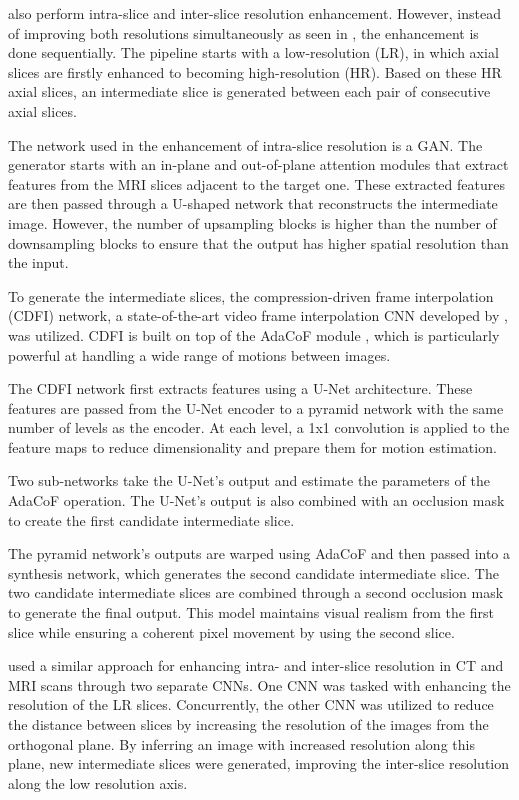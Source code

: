 \textcite{Nimitha2024} also perform intra-slice and inter-slice resolution enhancement. However, instead of improving both resolutions simultaneously as seen in \textcite{Zhang2024, Fang2022}, the enhancement is done sequentially. The pipeline starts with a low-resolution (LR), in which axial slices are firstly enhanced to becoming high-resolution (HR). Based on these HR axial slices, an intermediate slice is generated between each pair of consecutive axial slices.
\par
The network used in the enhancement of intra-slice resolution is a GAN. The generator starts with an in-plane and out-of-plane attention modules that extract features from the MRI slices adjacent to the target one. These extracted features are then passed through a U-shaped network that reconstructs the intermediate image. However, the number of upsampling blocks is higher than the number of downsampling blocks to ensure that the output has higher spatial resolution than the input.
\par
To generate the intermediate slices, the compression-driven frame interpolation (CDFI) network, a state-of-the-art video frame interpolation CNN developed by \textcite{Ding2021}, was utilized. CDFI is built on top of the AdaCoF module \parencite{Lee2020}, which is particularly powerful at handling a wide range of motions between images.
\par 
The CDFI network first extracts features using a U-Net architecture. These features are passed from the U-Net encoder to a pyramid network with the same number of levels as the encoder. At each level, a 1x1 convolution is applied to the feature maps to reduce dimensionality and prepare them for motion estimation.
\par
Two sub-networks take the U-Net's output and estimate the parameters of the AdaCoF operation. The U-Net's output is also combined with an occlusion mask to create the first candidate intermediate slice.
\par
The pyramid network's outputs are warped using AdaCoF and then passed into a synthesis network, which generates the second candidate intermediate slice. The two candidate intermediate slices are combined through a second occlusion mask to generate the final output. This model maintains visual realism from the first slice while ensuring a coherent pixel movement by using the second slice.
\par
\textcite{Georgescu2020} used a similar approach for enhancing intra- and inter-slice resolution in CT and MRI scans through two separate CNNs. One CNN was tasked with enhancing the resolution of the LR slices. Concurrently, the other CNN was utilized to reduce the distance between slices by increasing the resolution of the images from the orthogonal plane. By inferring an image with increased resolution along this plane, new intermediate slices were generated, improving the inter-slice resolution along the low resolution axis.
